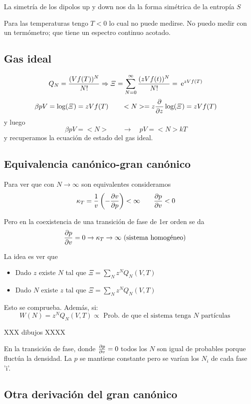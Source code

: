 \documentclass[10pt,oneside]{CBFT_book}
\begin{document}
La simetría de los dipolos up y down nos da la forma simétrica de la entropía $S$

Para las temperaturas tengo $T<0$ lo cual no puede medirse. No puedo medir con un termómetro; que
tiene un espectro continuo acotado.


\subsection{Gas ideal}

\[
	Q_N = \frac{(Vf(T))^N}{N!} \Rightarrow \Xi = \sum_{N=0}^\infty \frac{(zVf(t))^N}{N!} = \:\mathrm{e}^{zVf(T)}
\]
\[
	\beta pV = \log (\Xi) = zVf(T) \qquad <N> = z \frac{\partial^{\hspace{-0.05em}} {}}{\partial {z}^{\hspace{-0.05em}}} \log (\Xi) = zVf(T)
\]
y luego 
\[
	\beta pV = <N> \qquad \rightarrow \quad pV = <N> k T
\]
y recuperamos la ecuación de estado del gas ideal.


\subsection{Equivalencia canónico-gran canónico}

Para ver que con $ N \to \infty $ son equivalentes consideramos 
\[
	\kappa_T = \frac{1}{v} \left( -\frac{\partial^{\hspace{-0.05em}} {v}}{\partial {p}^{\hspace{-0.05em}}} \right) < \infty \qquad \frac{\partial^{\hspace{-0.05em}} {p}}{\partial {v}^{\hspace{-0.05em}}} < 0
\]

Pero en la coexistencia de una transición de fase de 1er orden se da 
\[
	\frac{\partial^{\hspace{-0.05em}} {p}}{\partial {v}^{\hspace{-0.05em}}} = 0  \rightarrow \kappa_T \to \infty \text{ (sistema homogéneo) }
\]

La idea es ver que 
\begin{itemize}
 \item Dado $z$ existe $N$ tal que $ \Xi = \sum_N z^N Q_N(V,T) $
 \item Dado $N$ existe $z$ tal que $ \Xi = \sum_N z^N Q_N(V,T) $
\end{itemize}

Esto se comprueba. Además, si:
\[
	W (N) = z^N Q_N (V,T) \propto \text{ Prob. de que el sistema tenga $N$ partículas }
\]

XXX dibujos XXXX

En la transición de fase, donde $ \frac{\partial^{\hspace{-0.05em}} {p}}{\partial {v}^{\hspace{-0.05em}}} = 0  $ todos los $ N $ son igual de probables porque
fluctúa la densidad. La $p$ se mantiene constante pero se varían los $ N_i $ de cada fase 'i'.


\subsection{Otra derivación del gran canónico}
\end{document}
